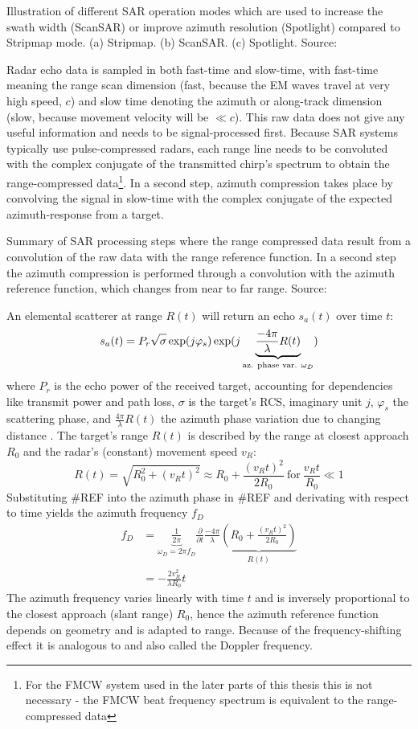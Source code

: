 %
Illustration of different SAR operation modes which are used to increase
the swath width (ScanSAR) or improve azimuth resolution (Spotlight)
compared to Stripmap mode. (a) Stripmap. (b) ScanSAR. (c) Spotlight.
Source: \cite{Moreira2013}

Radar echo data is sampled in both fast-time and slow-time, with
fast-time meaning the range scan dimension (fast, because the EM waves
travel at very high speed, \(c\)) and slow time denoting the azimuth or
along-track dimension (slow, because movement velocity will be
\(\ll c\)). This raw data does not give any useful information and needs
to be signal-processed first. Because SAR systems typically use
pulse-compressed radars, each range line needs to be convoluted with the
complex conjugate of the transmitted chirp's spectrum to obtain the
range-compressed
data\footnote{For the FMCW system used in the later parts of this thesis this is not necessary - the FMCW beat frequency spectrum is equivalent to the range-compressed data}.
In a second step, azimuth compression takes place by convolving the
signal in slow-time with the complex conjugate of the expected
azimuth-response from a target.

%
Summary of SAR processing steps where the range compressed data result
from a convolution of the raw data with the range reference function. In
a second step the azimuth compression is performed through a convolution
with the azimuth reference function, which changes from near to far
range. Source: \cite{Moreira2013}

An elemental scatterer at range \(R(t)\) will return an echo \(s_a(t)\)
over time \(t\): \[
s_a(t) = P_r \sqrt{\sigma\vphantom{1}} \exp(j\varphi_s)\exp(j \underbrace{\frac{-4\pi}{\lambda}R(t)}_\text{az. phase var. $\omega_D$})
\] where \(P_r\) is the echo power of the received target, accounting
for dependencies like transmit power and path loss, \(\sigma\) is the
target's RCS, imaginary unit \(j\), \(\varphi_s\) the scattering phase,
and \(\frac{4\pi}{\lambda}R(t)\) the azimuth phase variation due to
changing distance \cite{Cumming2004}. The target's range \(R(t)\) is
described by the range at closest approach \(R_0\) and the radar's
(constant) movement speed \(v_R\): \[
R(t) = \sqrt{R_0^2+\left(v_Rt\right)^2} \approx R_0 + \frac{(v_Rt)^2}{2R_0} ~\text{for}~ \frac{v_Rt}{R_0} \ll 1
\] Substituting \#REF into the azimuth phase in \#REF and derivating
with respect to time yields the azimuth frequency \(f_D\) \[
\begin{aligned}
f_D &= \underbrace{\frac{1}{2\pi}}_{\omega_D = 2\pi f_D} \frac{\partial}{\partial t} \frac{-4\pi}{\lambda}  \underbrace{\left( R_0 + \frac{(v_Rt)^2}{2R_0}  \right)}_{R(t)} \\
&= -\frac{2v_R^2}{\lambda R_0}t
\end{aligned}
\] The azimuth frequency varies linearly with time \(t\) and is
inversely proportional to the closest approach (slant range) \(R_0\),
hence the azimuth reference function depends on geometry and is adapted
to range. Because of the frequency-shifting effect it is analogous to
and also called the Doppler frequency.

